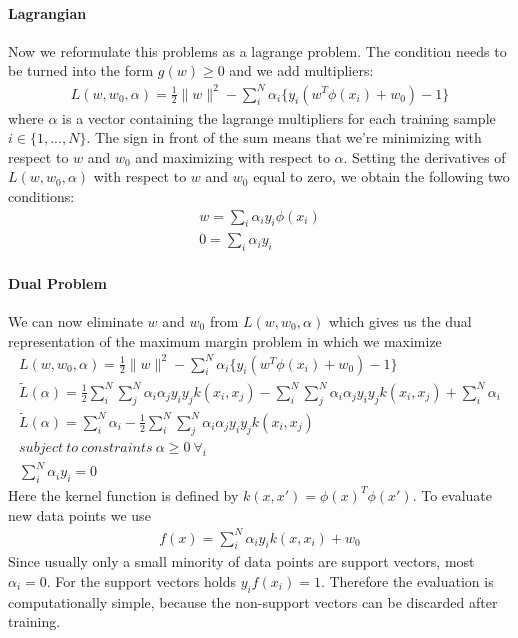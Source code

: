 \documentclass[main]{subfiles}
\begin{document}
\paragraph{Lagrangian}
Now we reformulate this problems as a lagrange problem. The condition needs to be turned into the form $g(w) \geq 0$ and we add multipliers:
\begin{align}
L(w,w_0,\alpha)=\frac{1}{2}\parallel w \parallel^2 - \sum_i^N \alpha_i \{y_i (w^T\phi(x_i) + w_0) - 1\}
\end{align}
where $\alpha$ is a vector containing the lagrange multipliers for each training sample $i \in \{1, ... ,N\}$. The sign in front of the sum means that we're minimizing with respect to $w$ and $w_0$ and maximizing with respect to $\alpha$. Setting the derivatives of $L(w,w_0,\alpha)$ with respect to $w$ and $w_0$ equal to zero, we obtain the following two conditions:
\begin{align}
w = \sum_i \alpha_i y_i \phi(x_i) \\
0 = \sum_i \alpha_i y_i
\end{align}
\paragraph{Dual Problem}
We can now eliminate $w$ and $w_0$ from $L(w,w_0,\alpha)$ which gives us the dual representation of the maximum margin problem in which we maximize
\begin{align}
L(w,w_0,\alpha)=\frac{1}{2}\parallel w \parallel^2 - \sum_i^N \alpha_i \{y_i (w^T\phi(x_i) + w_0) - 1\} \\
\tilde{L}(\alpha)=\frac{1}{2} \sum_i^N \sum_j^N \alpha_i \alpha_j y_i y_j k(x_i, x_j) - \sum_i^N \sum_j^N \alpha_i \alpha_j y_i y_j k(x_i, x_j) + \sum_i^N \alpha_i \\
\tilde{L}(\alpha)=\sum_i^N \alpha_i - \frac{1}{2} \sum_i^N \sum_j^N \alpha_i \alpha_j y_i y_j k(x_i, x_j) \\
subject \ to \ constraints \ \alpha  \geq 0 \ \forall_i \\
\sum_i^N \alpha_i y_i = 0
\end{align}
Here the kernel function is defined by $k(x, x')=\phi(x)^T \phi(x')$.
To evaluate new data points we use
\begin{align}
f(x)=\sum_i^N \alpha_i y_i k(x, x_i) + w_0
\end{align}
Since usually only a small minority of data points are support vectors, most $\alpha_i=0$. For the support vectors holds $y_if(x_i) = 1$. Therefore the evaluation is computationally simple, because the non-support vectors can be discarded after training. \newline
\end{document}
